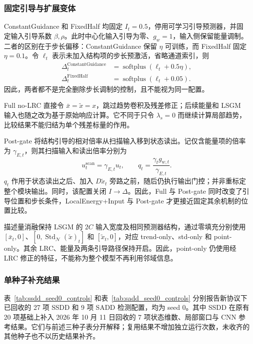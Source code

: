 \documentclass[journal]{IEEEtran}
\begin{document}
\subsubsection{固定引导与扩展变体}

ConstantGuidance 和 FixedHalf 均固定 $I_t=0.5$，停用可学习引导预测器，并固定输入引导系数 $\beta,\rho$。此时中心化输入引导为零、$g_w=1$，输入侧保留能量调制。二者的区别在于步长偏移：ConstantGuidance 保留 $\eta$ 可训练，而 FixedHalf 固定 $\eta=0.1$。令 $\ell_t$ 表示未加入结构项的步长预激活，省略通道索引，则
\begin{equation}
\begin{aligned}
\Delta_t^{\mathrm{ConstantGuidance}}
&=\operatorname{softplus}(\ell_t+0.5\eta),\\
\Delta_t^{\mathrm{FixedHalf}}
&=\operatorname{softplus}(\ell_t+0.05).
\end{aligned}
\label{eq:constant_guidance_controls}
\end{equation}
因此，两者都不是完全删除步长调制的控制，且不能视为同一配置。

Full no-LRC 直接令 $\bar{x}=\widetilde{x}=x$，跳过趋势卷积及残差修正；后续能量和 LSGM 输入也随之改为基于原始响应计算。它不同于只令 $\lambda_s=0$ 而继续计算局部趋势，比较结果不能归结为单个残差标量的作用。

Post-gate 将结构引导的相对倍率从扫描输入移到状态读出。记仅含能量项的倍率为 $\gamma_{E,t}$，则其扫描输入和读出倍率分别为
\begin{equation}
u_t^{\mathrm{scan}}=\gamma_{E,t}u_t,\qquad
q_t=\frac{\gamma_t g_{w,t}}{\gamma_{E,t}}.
\label{eq:post_gate_control}
\end{equation}
$q_t$ 作用于状态读出之后、加入 $D\widetilde{x}_t$ 旁路之前，随后仍执行输出门控；并非重标定整个模块输出。同时，该配置关闭 $I\to\Delta$。因此，Full 与 Post-gate 同时改变了引导位置和步长条件，LocalEnergy+Input 与 Post-gate 才更接近固定其余机制的位置比较。

描述量消融保持 LSGM 的 $2C$ 输入宽度及相同预测器结构，通过零填充分别使用 $[\bar{x}_t,0]$、$[0,\operatorname{Std}_{\mathcal N}(\widetilde{x})_t]$ 和 $[\widetilde{x}_t,0]$，对应 trend-only、std-only 和 point-only。其余 LRC、能量及两条引导路径保持开启。因此，point-only 仍使用经 LRC 修正的特征，不能称为整个模型不再利用邻域信息。

\subsubsection{单种子补充结果}

表~\ref{tab:ssdd_seed0_controls} 和表~\ref{tab:sadd_seed0_controls} 分别报告新协议下已回收的 27 项 SSDD 和 9 项 SADD 检测配置，均为 seed 0。其中 SSDD 在原有 20 项基础上补入 2026 年 10 月 11 日回收的 7 项状态维数、局部窗口与 CNN 参考结果。它们与前述三种子表分开解释；复用结果不增加独立运行次数，未收齐的其他种子也不以历史结果补齐。
\end{document}
